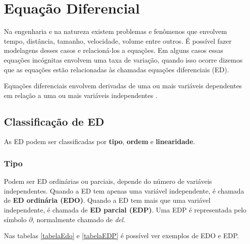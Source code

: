 \chapter[Equação diferencial]{Equação Diferencial}
Na engenharia e na natureza existem problemas e fenômenos que envolvem tempo, distância, tamanho, velocidade, volume entre outros. É possível fazer modelagens desses casos e relacioná-los a equações. Em alguns casos essas equações incógnitas envolvem uma taxa de variação, quando isso ocorre dizemos que as equações estão relacionadas às chamadas equações diferenciais (ED).

Equações diferenciais envolvem derivadas de uma ou mais variáveis dependentes em relação a uma ou mais variáveis independentes \cite{explicacaoEDO}.

\section[Classificação de ED]{Classificação de ED}

As ED podem ser classificadas por \textbf{tipo}, \textbf{ordem} e \textbf{linearidade}.

\subsection[Tipo]{Tipo}

Podem ser ED ordinárias ou parciais, depende do número de variáveis independentes. Quando a ED tem apenas uma variável independente, é chamada de \textbf{ED ordinária (EDO)}. Quando a ED tem mais que uma variável independente, é chamada de \textbf{ED parcial (EDP)}.
Uma EDP é representada pelo símbolo $ \partial $, normalmente chamado de \textit{del}.

Nas tabelas \ref{tabelaEdo} e \ref{tabelaEDP}  é possível ver exemplos de EDO e EDP.

